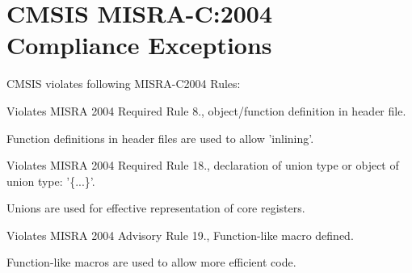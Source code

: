 \hypertarget{group___c_m_s_i_s___m_i_s_r_a___exceptions}{\section{C\-M\-S\-I\-S M\-I\-S\-R\-A-\/\-C\-:2004 Compliance Exceptions}
\label{group___c_m_s_i_s___m_i_s_r_a___exceptions}
}
C\-M\-S\-I\-S violates following M\-I\-S\-R\-A-\/\-C2004 Rules\-:


\begin{DoxyItemize}
\item Violates M\-I\-S\-R\-A 2004 Required Rule 8., object/function definition in header file.\par
 Function definitions in header files are used to allow 'inlining'.
\item Violates M\-I\-S\-R\-A 2004 Required Rule 18., declaration of union type or object of union type\-: '\{...\}'.\par
 Unions are used for effective representation of core registers.
\item Violates M\-I\-S\-R\-A 2004 Advisory Rule 19., Function-\/like macro defined.\par
 Function-\/like macros are used to allow more efficient code. 
\end{DoxyItemize}